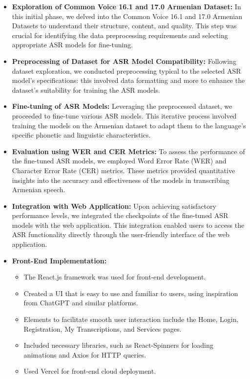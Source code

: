 \documentclass[conference]{IEEEtran}
\begin{document}
\begin{itemize}
    \item \textbf{Exploration of Common Voice 16.1 and 17.0 Armenian Dataset:} In this initial phase, we delved into the Common Voice 16.1 and 17.0 Armenian Datasets to understand their structure, content, and quality. This step was crucial for identifying the data preprocessing requirements and selecting appropriate ASR models for fine-tuning.
    \item \textbf{Preprocessing of Dataset for ASR Model Compatibility:} Following dataset exploration, we conducted preprocessing typical to the selected ASR model's specifications: this involved data formatting and more to enhance the dataset's suitability for training the ASR models.
    \item \textbf{Fine-tuning of ASR Models:} Leveraging the preprocessed dataset, we proceeded to fine-tune various ASR models. This iterative process involved training the models on the Armenian dataset to adapt them to the language's specific phonetic and linguistic characteristics.
    \item \textbf{Evaluation using WER and CER Metrics:} To assess the performance of the fine-tuned ASR models, we employed Word Error Rate (WER) and Character Error Rate (CER) metrics. These metrics provided quantitative insights into the accuracy and effectiveness of the models in transcribing Armenian speech.
    \item \textbf{Integration with Web Application:} Upon achieving satisfactory performance levels, we integrated the checkpoints of the fine-tuned ASR models with the web application. This integration enabled users to access the ASR functionality directly through the user-friendly interface of the web application.
    \item \textbf{Front-End Implementation:}
        \begin{itemize}
            \item The React.js framework was used for front-end development.
            \item Created a UI that is easy to use and familiar to users, using inspiration from ChatGPT and similar platforms.
            \item Elements to facilitate smooth user interaction include the Home, Login, Registration, My Transcriptions, and Services pages.
            \item Included necessary libraries, such as React-Spinners for loading animations and Axios for HTTP queries.
            \item Used Vercel for front-end cloud deployment.

\end{itemize}
\end{itemize}
\end{document}
